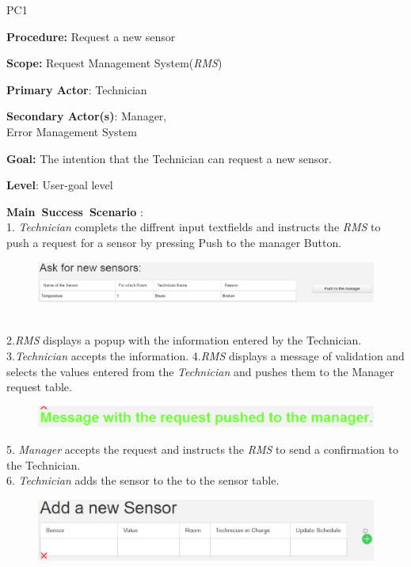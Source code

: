 \begin{lyxlist}{PC1}
\small{
\item [\textbf{Procedure:}] Request a new sensor
\item [\textbf{Scope:}] Request Management System(\emph{RMS})
\item [\textbf{Primary Actor}:] Technician
\item [\textbf{Secondary Actor(s)}:] Manager,\\
 Error Management System
\item [\textbf{Goal:}] The intention that the Technician can request a new
sensor.
\item [\textbf{Level}:] User-goal level
\item [\textbf{Main~Success~Scenario}]:\\
1. \emph{Technician} complets the diffrent input textfields and instructs the
\emph{RMS} to push a request for a sensor by pressing Push to the manager Button.
\begin{figure}
\includegraphics[width=1\textwidth]{images/AskForNewSensor.eps}
\end{figure} \\
2.\emph{RMS} displays a popup with the information entered by the Technician.
3.\emph{Technician} accepts the information.
4.\emph{RMS} displays a message of validation and selects the values entered
from the \emph{Technician} and pushes them to the Manager request table.\\
 \begin{figure}
\includegraphics[width=1\textwidth]{images/RequestAskForNewSensor.eps}
\end{figure}
5. \emph{Manager} accepts the request and instructs the \emph{RMS} to send a
confirmation to the Technician.\\
6. \emph{Technician} adds the sensor to the to the sensor table.\\
 \begin{figure}
\includegraphics[width=1\textwidth]{images/AddANewSensor.eps}
\end{figure} 

}
\end{lyxlist}
